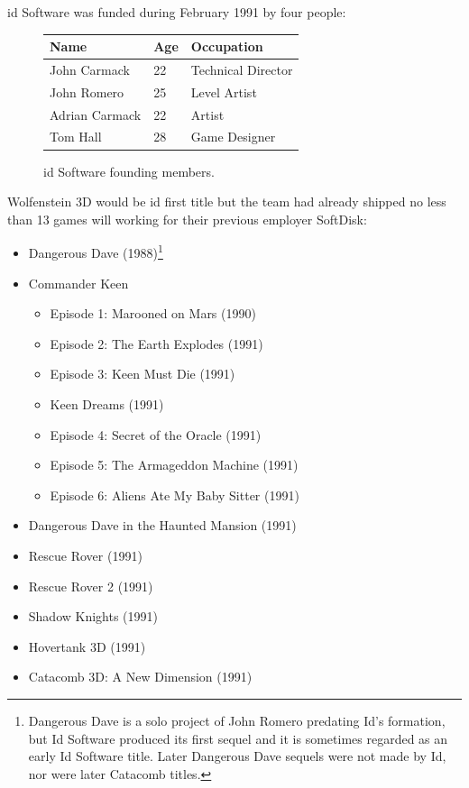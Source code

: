 \documentclass[book.tex]{subfiles}
\begin{document}
id Software was funded during February 1991 by four people: 

 \begin{figure}[H]
\centering  
\begin{tabularx}{\textwidth}{ X  X  X  }
  \toprule
  \textbf{Name} &  \textbf{Age} & \textbf{Occupation} \\
  \toprule 
   John Carmack & 22 &  Technical Director\\
   John Romero & 25 &  Level Artist\\
   Adrian Carmack & 22 &  Artist\\
   Tom Hall & 28 &  Game Designer\\
     \toprule
\end{tabularx}
\caption{id Software founding members.}\label{fig:Id Software team}
\end{figure}

Wolfenstein 3D would be id first title but the team had already shipped no less than 13 games will working for their previous employer SoftDisk:\\
\begin{itemize}
  \item Dangerous Dave (1988)\footnote{Dangerous Dave is a solo project of John Romero predating Id's formation, but Id Software produced its first sequel and it is sometimes regarded as an early Id Software title. Later Dangerous Dave sequels were not made by Id, nor were later Catacomb titles.}
  \item Commander Keen
  \begin{itemize}
    \item Episode 1: Marooned on Mars (1990)
    \item Episode 2: The Earth Explodes (1991)
    \item Episode 3: Keen Must Die (1991)
    \item Keen Dreams (1991)
    \item Episode 4: Secret of the Oracle (1991)
    \item Episode 5: The Armageddon Machine (1991)
    \item Episode 6: Aliens Ate My Baby Sitter (1991)
  \end{itemize}
  
  \item Dangerous Dave in the Haunted Mansion (1991)
  \item Rescue Rover (1991)
  \item Rescue Rover 2 (1991)
  \item Shadow Knights (1991)
  \item Hovertank 3D (1991)
  \item Catacomb 3D: A New Dimension (1991)
\end{itemize}
\end{document}
